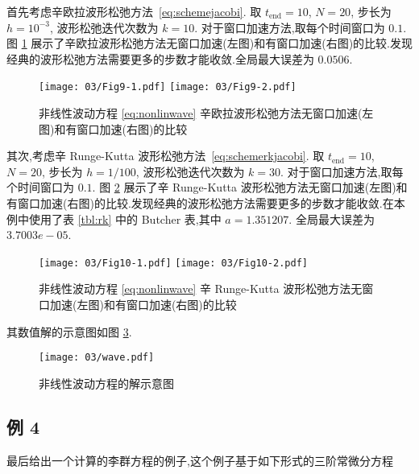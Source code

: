 首先考虑辛欧拉波形松弛方法~\eqref{eq:schemejacobi}. 取 $t_{\text{end}} = 10$, $N=20$, 步长为 $h = 10^{-3}$, 波形松弛迭代次数为 $k=10$. 对于窗口加速方法,取每个时间窗口为 $0.1$. 图 \ref{fig:ex3seucom} 展示了辛欧拉波形松弛方法无窗口加速(左图)和有窗口加速(右图)的比较.发现经典的波形松弛方法需要更多的步数才能收敛.全局最大误差为 $0.0506$.

\begin{figure}[h!]
  \centering
  \texttt{[image: 03/Fig9-1.pdf]}
  \texttt{[image: 03/Fig9-2.pdf]}
  \caption{非线性波动方程 \eqref{eq:nonlinwave} 辛欧拉波形松弛方法无窗口加速(左图)和有窗口加速(右图)的比较}
  \label{fig:ex3seucom}
\end{figure}

其次,考虑辛 Runge-Kutta 波形松弛方法~\eqref{eq:schemerkjacobi}. 取 $t_{\text{end}} = 10$, $N=20$, 步长为 $h = 1/100$, 波形松弛迭代次数为 $k=30$. 对于窗口加速方法,取每个时间窗口为 $0.1$. 图 \ref{fig:ex3srkcom} 展示了辛 Runge-Kutta 波形松弛方法无窗口加速(左图)和有窗口加速(右图)的比较.发现经典的波形松弛方法需要更多的步数才能收敛.在本例中使用了表 \ref{tbl:rk} 中的 Butcher 表,其中 $a = 1.351207$. 全局最大误差为 $3.7003e-05$.

\begin{figure}[h!]
  \centering
  \texttt{[image: 03/Fig10-1.pdf]}
  \texttt{[image: 03/Fig10-2.pdf]}
  \caption{非线性波动方程 \eqref{eq:nonlinwave} 辛 Runge-Kutta 波形松弛方法无窗口加速(左图)和有窗口加速(右图)的比较}
  \label{fig:ex3srkcom}
\end{figure}

其数值解的示意图如图 \ref{fig:wavefig}.

\begin{figure}[h!]
  \centering
  \texttt{[image: 03/wave.pdf]}
  \caption{非线性波动方程的解示意图}
  \label{fig:wavefig}
\end{figure}

\subsection*{例 4}
最后给出一个计算的李群方程的例子,这个例子基于如下形式的三阶常微分方程

